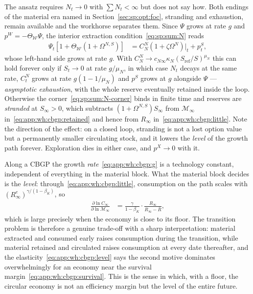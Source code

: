 The ansatz requires $N_t\to0$ with $\sum N_t<\infty$ but does not say how. Both endings of the material era named in Section~\ref{sec:sp:opt:foc}, stranding and exhaustion, remain available and the workhorse separates them. Since $\Psi$ grows at rate $g$ and $p^W=-\Theta_{\mathcal W}\Psi$, the interior extraction condition~\eqref{eq:sp:sum:N} reads
\begin{align}
\Psi_t\left[1+\Theta_{\mathcal W}\left(1+\Omega^{N,S}\right)\right] &= C^N_N\left(1+\zeta\Omega^N\right)\Big|_t+p^S_t ,
\label{eq:app:wh:cbgp:extraction}
\end{align}
whose left-hand side grows at rate $g$. With $C^N_N\to c_{N\infty}\kappa_N\left(S_{\mathrm{ref}}/S\right)^{\mu_N}$ this can hold forever only if $S_t\to0$ at rate $g/\mu_N$, in which case $N_t$ decays at the same rate, $C^N_t$ grows at rate $g\left(1-1/\mu_N\right)$ and $p^S$ grows at $g$ alongside $\Psi$ --- \emph{asymptotic exhaustion}, with the whole reserve eventually retained inside the loop. Otherwise the corner~\eqref{eq:sp:sum:N-corner} binds in finite time and reserves are \emph{stranded} at $S_\infty>0$, which subtracts $\left(1+\Omega^{N,S}\right)S_\infty$ from $\mathcal M_\infty$ in~\eqref{eq:app:wh:cbgp:retained} and hence from $R_\infty$ in~\eqref{eq:app:wh:cbgp:little}. Note the direction of the effect: on a closed loop, stranding is not a lost option value but a permanently smaller circulating stock, and it lowers the \emph{level} of the growth path forever. Exploration dies in either case, and $p^X\to0$ with it.

 Along a CBGP the growth \emph{rate}~\eqref{eq:app:wh:cbgp:g} is a technology constant, independent of everything in the material block. What the material block decides is the \emph{level}: through~\eqref{eq:app:wh:cbgp:little}, consumption on the path scales with $\left(R^e_\infty\right)^{\gamma/\left(1-\beta_K\right)}$, so
\begin{align}
\frac{\partial\ln C_\infty}{\partial\ln\mathcal M_\infty} &= \frac{\gamma}{1-\beta_K}\cdot\frac{R_\infty}{R_\infty-\bar R} ,
\label{eq:app:wh:cbgp:level}
\end{align}
which is large precisely when the economy is close to its floor. The transition problem is therefore a genuine trade-off with a sharp interpretation: material extracted and consumed early raises consumption during the transition, while material retained and circulated raises consumption at every date thereafter, and the elasticity~\eqref{eq:app:wh:cbgp:level} says the second motive dominates overwhelmingly for an economy near the survival margin~\eqref{eq:app:wh:cbgp:survival}. This is the sense in which, with a floor, the circular economy is not an efficiency margin but the level of the entire future.

